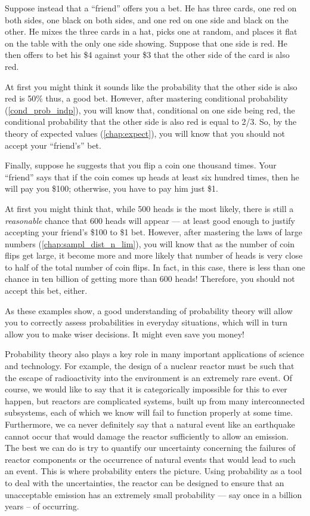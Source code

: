 Suppose instead that a ``friend'' offers you a bet. He has three cards, one red on both sides, one black on both
sides, and one red on one side  and black on the other. He mixes the three cards in a hat, picks one at random, and
places it flat on the table with the only one side showing. Suppose that one side is red. He then offers to bet his
\$4 against your \$3 that the other side of the card is also red.

At first you might think it sounds like the probability that the other side is also red is 50\% thus, a good bet.
However, after mastering conditional probability (\autoref{cond_prob_indp}), you will know that, conditional on one
side being red, the conditional probability that the other side is also red is equal to 2/3. So, by the theory of
expected values (\autoref{chap:expect}), you will know that you should not accept your ``friend's'' bet.

Finally, suppose he suggests that you flip a coin one thousand times. Your ``friend'' says that if the coin comes up
heads at least six hundred times, then  he will  pay you \$100; otherwise, you have to pay him just \$1.

At first you might think that, while 500 heads is the most likely, there is still a \emph{reasonable} chance that 600
heads will appear --- at least good enough to justify accepting your friend's \$100 to \$1 bet. However, after
mastering the laws of large numbers (\autoref{chap:sampl_dist_n_lim}), you will know that as the number of coin flips
get large, it become more and more likely that number of heads is very close to half of the total number of coin
flips. In fact, in this case, there is less than one chance in ten billion of getting more than 600 heads! Therefore,
you should not accept this bet, either.

As these examples show, a good understanding of probability theory will allow you to correctly assess probabilities
in everyday situations, which will in turn allow you to make wiser decisions. It might even save you money!

Probability theory also plays a key role in many important applications of science and technology. For example, the
design of a nuclear reactor must be such that the escape of radioactivity into the environment is an extremely rare
event. Of course, we would like to say that it is categorically impossible for this to ever happen, but reactors are
complicated systems, built up from many interconnected subsystems, each of which we know will fail to function
properly at some time. Furthermore, we ca never definitely say that a natural event like an earthquake cannot occur
that would damage the reactor sufficiently to allow an emission. The best we can do is try to quantify our
uncertainty concerning the failures of reactor components or the occurrence of natural events that would lead to such
an event.  This is where probability enters the picture. Using probability as a tool to deal with the uncertainties,
the reactor can be designed to ensure that an unacceptable emission has an extremely small probability --- say once
in a billion years -- of occurring.


